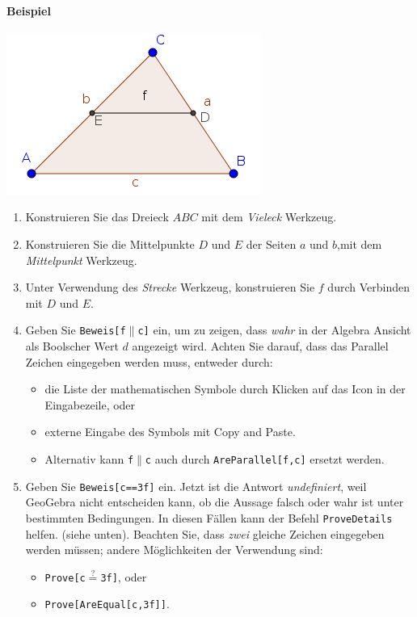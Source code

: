 \documentclass{article}
\begin{document}
\vfill\eject %

\paragraph{Beispiel}
\begin{center}
\includegraphics[scale=0.5]{Prove-example}
\end{center}
\begin{enumerate}
\item Konstruieren Sie das Dreieck $ABC$ mit dem \textit{Vieleck} Werkzeug.
\item Konstruieren Sie die Mittelpunkte $D$ und $E$ der Seiten $a$ und $b$,mit dem \textit{Mittelpunkt} Werkzeug.
\item Unter Verwendung des \textit{Strecke} Werkzeug, konstruieren Sie $f$ durch Verbinden mit $D$ und $E$.
\item Geben Sie \texttt{Beweis[f$\parallel$c]} ein, um zu zeigen, dass \textit{wahr} in der Algebra Ansicht als Boolscher Wert $d$ angezeigt wird. Achten Sie darauf, dass das Parallel Zeichen eingegeben werden muss, entweder durch:
\begin{itemize}
\item die Liste der mathematischen Symbole durch Klicken auf das \framebox{$\alpha$} Icon in der Eingabezeile, oder
\item externe Eingabe des Symbols mit Copy and Paste.
\item Alternativ kann \texttt{f$\parallel$c} auch durch \texttt{AreParallel[f,c]} ersetzt werden.
\end{itemize}

\item Geben Sie \texttt{Beweis[c==3f]} ein. Jetzt ist die Antwort \textit{undefiniert}, weil GeoGebra nicht entscheiden kann, ob die Aussage falsch oder wahr ist unter bestimmten Bedingungen. In diesen Fällen kann der Befehl \texttt{ProveDetails} helfen. (siehe unten). Beachten Sie, dass \textit{zwei} gleiche Zeichen eingegeben werden müssen; andere Möglichkeiten der Verwendung sind:
\begin{itemize}
    \item \texttt{Prove[c$\stackrel{?}{=}$3f]}, oder
    \item \texttt{Prove[AreEqual[c,3f]]}.
\end{itemize}

\end{enumerate}
\end{document}
